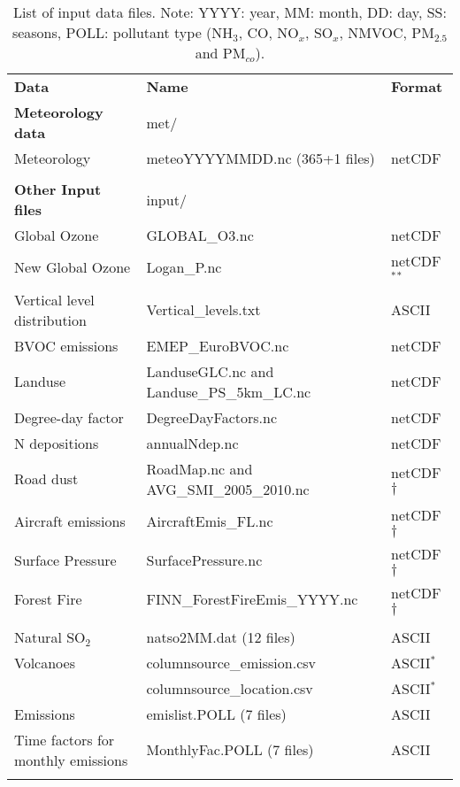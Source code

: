 \begin{table}
\caption[List of input data files]{List of input data files.
Note: YYYY: year, MM: month, DD: day, SS: seasons, POLL: pollutant
type (NH$_3$, CO, NO$_x$, SO$_x$, NMVOC,
PM$_{2.5}$ and PM$_{co}$). 
\label{Tab:inputdata}}
\begin{center}
\begin{small}
\begin{tabular}{lll}
\hline
{\bf Data} &  {\bf Name} & {\bf Format}\\
{\bf Meteorology data} & met/&  \\
Meteorology  &  meteoYYYYMMDD.nc \quad (365+1 files) & netCDF\\
& & \\
{\bf Other Input files} & input/ &\\
Global Ozone & GLOBAL\_O3.nc & netCDF\\
New Global Ozone & Logan\_P.nc & netCDF $^*$$^*$\\
Vertical level distribution & Vertical\_levels.txt & ASCII\\
BVOC emissions & EMEP\_EuroBVOC.nc & netCDF\\
Landuse & LanduseGLC.nc and Landuse\_PS\_5km\_LC.nc  & netCDF\\
Degree-day factor & DegreeDayFactors.nc &  netCDF\\
N depositions & annualNdep.nc  & netCDF\\
Road dust &  RoadMap.nc and AVG\_SMI\_2005\_2010.nc& netCDF$\dagger$ \\
Aircraft emissions & AircraftEmis\_FL.nc & netCDF$\dagger$ \\
Surface Pressure & SurfacePressure.nc & netCDF$\dagger$ \\
Forest Fire & FINN\_ForestFireEmis\_YYYY.nc & netCDF$\dagger$ \\
& & \\
Natural SO$_2$ & natso2MM.dat  \quad (12 files) & ASCII\\
Volcanoes & columnsource\_emission.csv & ASCII$^*$\\
	  & columnsource\_location.csv& ASCII$^*$ \\ 
Emissions & emislist.POLL  \quad (7 files) & ASCII\\
Time factors for monthly emissions& MonthlyFac.POLL  \quad (7 files) & ASCII\\
$$
\end{tabular}
\end{small}
\end{center}
\end{table}
